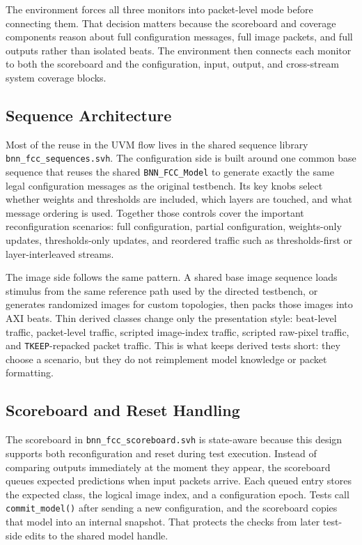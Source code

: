 The environment forces all three monitors into packet-level mode before
connecting them. That decision matters because the scoreboard and coverage
components reason about full configuration messages, full image packets, and
full outputs rather than isolated beats. The environment then connects each
monitor to both the scoreboard and the configuration, input, output, and
cross-stream system coverage blocks.

\subsection{Sequence Architecture}

Most of the reuse in the UVM flow lives in the shared sequence library
\texttt{bnn\_fcc\_sequences.svh}. The configuration side is built around one
common base sequence that reuses the shared \texttt{BNN\_FCC\_Model} to
generate exactly the same legal configuration messages as the original
testbench. Its key knobs select whether weights and thresholds are included,
which layers are touched, and what message ordering is used. Together those
controls cover the important reconfiguration scenarios: full configuration,
partial configuration, weights-only updates, thresholds-only updates, and
reordered traffic such as thresholds-first or layer-interleaved streams.

The image side follows the same pattern. A shared base image sequence loads
stimulus from the same reference path used by the directed testbench, or
generates randomized images for custom topologies, then packs those images into
AXI beats. Thin derived classes change only the presentation style: beat-level
traffic, packet-level traffic, scripted image-index traffic, scripted raw-pixel
traffic, and \texttt{TKEEP}-repacked packet traffic. This is what keeps
derived tests short: they choose a scenario, but they do not reimplement model
knowledge or packet formatting.

\subsection{Scoreboard and Reset Handling}

The scoreboard in \texttt{bnn\_fcc\_scoreboard.svh} is
state-aware because this design supports both reconfiguration and reset during
test execution. Instead of comparing outputs immediately at the moment they
appear, the scoreboard queues expected predictions when input packets arrive.
Each queued entry stores the expected class, the logical image index, and a
configuration epoch. Tests call \texttt{commit\_model()} after sending a new
configuration, and the scoreboard copies that model into an internal snapshot.
That protects the checks from later test-side edits to the shared model handle.

